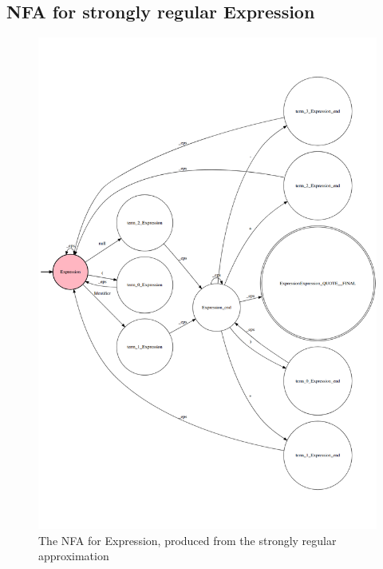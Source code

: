 \pagebreak\subsection{NFA for strongly regular Expression}
\begin{figure}[h!]
	\centering
	\includegraphics[scale=0.35]{Figures/advancedGrammar_NFA.png}
	\decoRule
 	\caption[NFA for Expression]{The NFA for Expression, produced from the strongly regular approximation}
 	\label{fig:advancedGrammar:NFA:Expression}
\end{figure}


